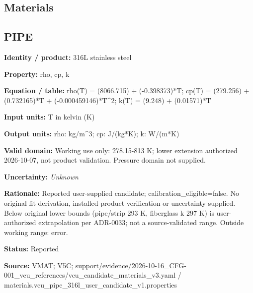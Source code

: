 \documentclass[11pt]{article}
\begin{document}
\clearpage\subsection{Materials}
\par\noindent\begin{minipage}{\textwidth}\small\setlength{\parskip}{2pt}
\subsection*{PIPE}
\textbf{Identity / product:} 316L stainless steel\par
\textbf{Property:} rho, cp, k\par
\textbf{Equation / table:} rho(T) = (8066.715) + (-0.398373)*T; cp(T) = (279.256) + (0.732165)*T + (-0.000459146)*T\textasciicircum{}2; k(T) = (9.248) + (0.01571)*T\par
\textbf{Input units:} T in kelvin (K)\par
\textbf{Output units:} rho: kg/m\textasciicircum{}3; cp: J/(kg*K); k: W/(m*K)\par
\textbf{Valid domain:} Working use only: 278.15-813 K; lower extension authorized 2026-10-07, not product validation. Pressure domain not supplied.\par
\textbf{Uncertainty:} \textit{Unknown}\par
\textbf{Rationale:} Reported user-supplied candidate; calibration\_\allowbreak{}eligible=false. No original fit derivation, installed-product verification or uncertainty supplied. Below original lower bounds (pipe/strip 293 K, fiberglass k 297 K) is user-authorized extrapolation per ADR-0033; not a source-validated range. Outside working range: error.\par
\textbf{Status:} Reported\par
\textbf{Source:} VMAT; V5C; support/evidence/2026-10-16\_\allowbreak{}CFG-001\_\allowbreak{}vcu\_\allowbreak{}references/vcu\_\allowbreak{}candidate\_\allowbreak{}materials\_\allowbreak{}v3.yaml / materials.vcu\_\allowbreak{}pipe\_\allowbreak{}316l\_\allowbreak{}user\_\allowbreak{}candidate\_\allowbreak{}v1.properties\par
\end{minipage}\par\vspace{5pt}
\end{document}
